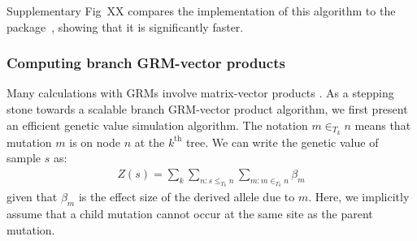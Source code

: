 Supplementary Fig~XX compares the \tskit{} implementation of this
algorithm to the \eGRM{} package~\citet{fan2022genealogical}, showing
that it is significantly faster. 



\subsubsection{Computing branch GRM-vector products}

Many calculations with GRMs involve matrix-vector products
\citep{colleau2002indirect, colleau2017fast}.
%
As a stepping stone towards a scalable branch GRM-vector product algorithm,
we first present an efficient genetic value simulation algorithm.
%
The notation $m \in_{T_k} n$ means that mutation $m$ is on node $n$ at the $k^{\text{th}}$ tree.
%
We can write the genetic value of sample $s$ as:
%
\begin{align} \label{eqn:genetic_value_trees}
    Z(s) = \sum_k \sum_{n: s\le_{T_k} n} \sum_{m:m \in_{T_k} n} \beta_m
\end{align}
%
given that $\beta_m$ is the effect size of the derived allele due to $m$.
%
Here, we implicitly assume that a child mutation cannot occur at the same site as the parent mutation.

